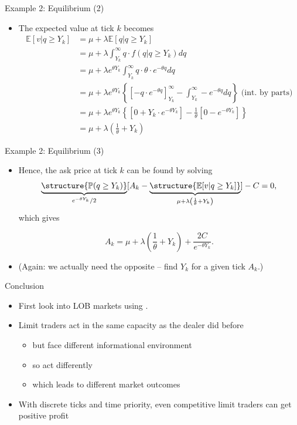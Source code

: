 \documentclass[english,10pt
,aspectratio=169
]{beamer}
\begin{document}
\begin{frame}{Example 2: Equilibrium (2)}
	\begin{itemize}
		\item The expected value at tick $k$ becomes
		\begin{align*}
		\mathbb{E}[v|q \geq Y_{k}] & =  \mu + \lambda \mathbb{E}[q|q \geq Y_{k}]\\
		&=\mu+ \lambda \int^\infty_{Y_k} q \cdot f(q|q \geq Y_{k}) dq\\
		&=\mu+ \lambda e^{\theta Y_{k}} \int^\infty_{Y_k} q \cdot \theta \cdot e^{-\theta q} dq\\
		& =  \mu+ \lambda e^{\theta Y_{k}} \left\{\left[- q \cdot e^{-\theta q} \right]^\infty_{Y_k} -\int^\infty_{Y_k} -e^{-\theta q} dq   \right\}\text{ (int. by parts)} \\
		& =  \mu+ \lambda e^{\theta Y_{k}} \left\{\left[0+ Y_k \cdot  e^{-\theta Y_k} \right] -\frac{1}{\theta}[0-e^{-\theta Y_k}]   \right\} \\
		& = \mu + \lambda \left( \frac{1}{\theta }+ Y_{k} \right)
		\end{align*}
	\end{itemize}
\end{frame}


\begin{frame}{Example 2: Equilibrium (3)}
	\begin{itemize}
		\item Hence, the ask price at tick $k$ can be found by solving
		\[
		\underbrace{\structure{\mathbb{P}(q \geq Y_k)}}_{e^{-\theta Y_{k}}/2}[A_k-\underbrace{\structure{\mathbb{E}[v|q \geq Y_k]}}_{\mu + \lambda \left( \frac{1}{\theta }+ Y_{k} \right)}] - C = 0,
		\]
		which gives
		\begin{block}{}
			\[
			A_k=\mu + \lambda \left( \frac{1}{\theta }+ Y_{k}\right) + \frac{2C}{e^{-\theta Y_{k}}}.
			\]
		\end{block}
		\item (Again: we actually need the opposite -- find $Y_k$ for a given tick $A_k$.)
	\end{itemize}
\end{frame}


\begin{frame}{Conclusion}
	\begin{itemize}
		\item First look into LOB markets using \cite{glosten_is_1994}.
		\item Limit traders act in the same capacity as the dealer did before
		\begin{itemize}
			\item but face different \alert{informational environment}
			\item so act differently
			\item which leads to different market outcomes
		\end{itemize}
		\item With discrete ticks and time priority, even competitive limit traders can get positive profit
	\end{itemize}
\end{frame}
\end{document}
